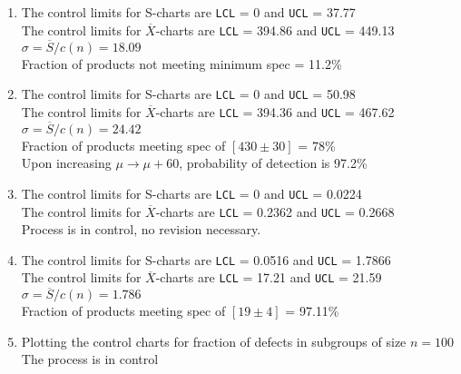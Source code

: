 \begin{enumerate}
	\item The control limits for S-charts are \texttt{LCL} = 0 and \texttt{UCL} = 37.77 \\
	The control limits for $ \overline{X} $-charts are \texttt{LCL} = 394.86 and \texttt{UCL} = 449.13 \\
	$ \sigma = \overline{S} / c(n)  = 18.09$\\
	Fraction of products not meeting minimum spec = 11.2\% \\
	
	\item The control limits for S-charts are \texttt{LCL} = 0 and \texttt{UCL} = 50.98 \\
	The control limits for $ \overline{X} $-charts are \texttt{LCL} = 394.36 and \texttt{UCL} = 467.62 \\
	$ \sigma = \overline{S} / c(n)  = 24.42$\\
	Fraction of products meeting spec of $ [430 \pm 30] $ = 78\% \\
	Upon increasing $ \mu \to \mu + 60 $, probability of detection is 97.2\% \\
	
	\item The control limits for S-charts are \texttt{LCL} = 0 and \texttt{UCL} = 0.0224 \\
	The control limits for $ \overline{X} $-charts are \texttt{LCL} = 0.2362 and \texttt{UCL} = 0.2668 \\
	Process is in control, no revision necessary.
	
	\item The control limits for S-charts are \texttt{LCL} = 0.0516 and \texttt{UCL} = 1.7866 \\
	The control limits for $ \overline{X} $-charts are \texttt{LCL} = 17.21 and \texttt{UCL} = 21.59 \\
	$ \sigma = \overline{S} / c(n)  = 1.786$\\
	Fraction of products meeting spec of $ [19 \pm 4] $ = 97.11\% \\
	
	\item Plotting the control charts for fraction of defects in subgroups of size $ n = 100 $\\
	The process is in control\\
	

\end{enumerate}
